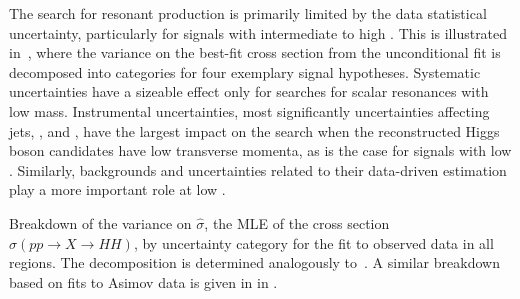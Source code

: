 The search for resonant \HH production is primarily limited by the data
statistical uncertainty, particularly for signals with intermediate to high
\mX. This is illustrated in~, where the variance on the
best-fit cross section from the unconditional fit
is decomposed into categories for four exemplary signal hypotheses. Systematic
uncertainties have a sizeable effect
only for searches for scalar resonances with low mass. Instrumental
uncertainties, most significantly uncertainties affecting jets, \pTmissAbs, and
\tauhadvis, have the largest impact on the search when the reconstructed Higgs
boson candidates have low transverse momenta, as is the case for signals with
low \mX. Similarly, \faketauhadvis backgrounds and uncertainties related to
their data-driven estimation
play a more important role at low \mX.

\begin{table}[htbp]
  \centering

  \caption{Breakdown of the variance on $\hat{\sigma}$, the MLE of the cross
    section $\sigma(pp \to X\to HH)$, by uncertainty category for the fit to
    observed data in all regions. The decomposition is determined analogously
    to~. A similar breakdown based on fits to Asimov
    data is given in  in
    .}%
  \label{tab:breakdown_res}

  

\end{table}


